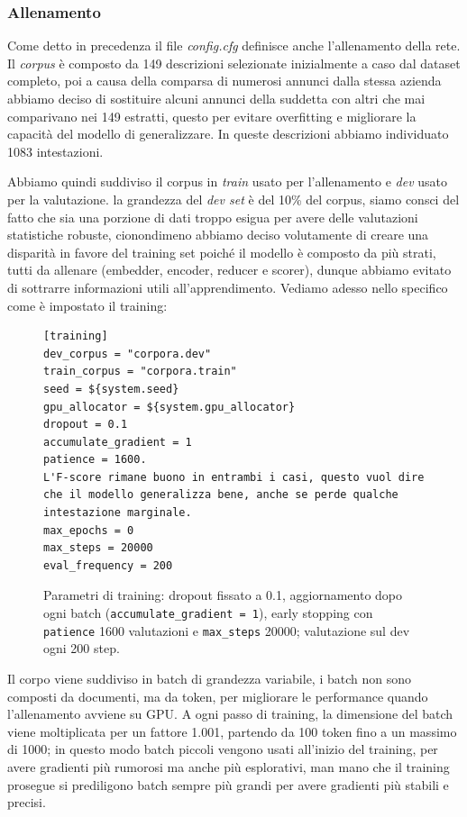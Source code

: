 \subsubsection{Allenamento}

\noindent Come detto in precedenza il file \textit{config.cfg} definisce anche l'allenamento della rete. Il \textit{corpus} è composto da 149 descrizioni selezionate inizialmente a caso dal dataset completo, poi a causa della comparsa di numerosi annunci dalla stessa azienda abbiamo deciso di sostituire alcuni annunci della suddetta con altri che mai comparivano nei 149 estratti, questo per evitare overfitting e migliorare la capacità del modello di generalizzare. In queste descrizioni abbiamo individuato 1083 intestazioni.

\noindent Abbiamo quindi suddiviso il corpus in \textit{train} usato per l'allenamento e \textit{dev} usato per la valutazione. la grandezza del \textit{dev set} è del 10\% del corpus, siamo consci del fatto che sia una porzione di dati troppo esigua per avere delle valutazioni statistiche robuste, cionondimeno abbiamo deciso volutamente di creare una disparità in favore del training set poiché il modello è composto da più strati, tutti da allenare (embedder, encoder, reducer e scorer), dunque abbiamo evitato di sottrarre informazioni utili all'apprendimento. Vediamo adesso nello specifico come è impostato il training:

\begin{figure}[H]
    \centering
    \scriptsize
\begin{lstlisting}[style=cmd]
[training]
dev_corpus = "corpora.dev"
train_corpus = "corpora.train"
seed = ${system.seed}
gpu_allocator = ${system.gpu_allocator}
dropout = 0.1
accumulate_gradient = 1
patience = 1600.
L'F-score rimane buono in entrambi i casi, questo vuol dire che il modello generalizza bene, anche se perde qualche intestazione marginale.
max_epochs = 0
max_steps = 20000
eval_frequency = 200
\end{lstlisting}
    \caption{Parametri di training: dropout fissato a 0.1, aggiornamento dopo ogni batch (\texttt{accumulate\_gradient = 1}), early stopping con \texttt{patience} 1600 valutazioni e \texttt{max\_steps} 20000; valutazione sul dev ogni 200 step.}
    \label{fig:cfg-training}
\end{figure}

\noindent Il corpo viene suddiviso in batch di grandezza variabile, i batch non sono composti da documenti, ma da token, per migliorare le performance quando l'allenamento avviene su GPU. A ogni passo di training, la dimensione del batch viene moltiplicata per un fattore 1.001, partendo da 100 token fino a un massimo di 1000; in questo modo batch piccoli vengono usati all'inizio del training, per avere gradienti più rumorosi ma anche più esplorativi, man mano che il training prosegue si prediligono batch sempre più grandi per avere gradienti più stabili e precisi. 

